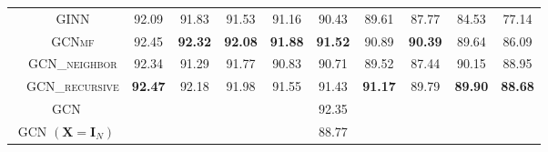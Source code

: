 \begin{table}[!pt]
{\begin{tabular}{c|c|ccccccccc}
& \textsc{GINN} & 92.09 & 91.83 & 91.53 & 91.16 & 90.43 & 89.61 & 87.77 & 84.53 & 77.14\\
& \textsc{GCNmf} & 92.45 & \textbf{92.32} & \textbf{92.08} & \textbf{91.88} & \textbf{91.52} & 90.89 & \textbf{90.39} & 89.64 & 86.09\\ 
& \textsc{GCN\_neighbor} & 92.34 & 91.29 & 91.77 & 90.83 & 90.71 & 89.52 & 87.44 & 90.15 & 88.95 \\ 
& \textsc{GCN\_recursive} & \bf{92.47} & 92.18 & 91.98 & 91.55 & 91.43 & \bf{91.17} & 89.79 & \bf{89.90} & \bf{88.68}\\ 
\midrule
\multicolumn{2}{c|}{GCN}& \multicolumn{9}{c}{92.35}\\
\multicolumn{2}{c|}{GCN $(\mathbf{X} = \mathbf{I}_N)$}& \multicolumn{9}{c}{88.77}\\
\bottomrule
    \end{tabular}
    }
\end{table}

